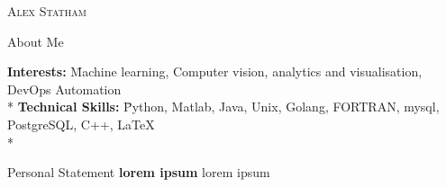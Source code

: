 \documentclass[a4paper]{article}
\newlength{\tabin}
\newlength{\secsep}
\newcommand{\lineunder}{\vspace*{-8pt} \\ \hspace*{-6pt} \hrulefill \\ \vspace*{-15pt}}
\newcommand{\name}[1]{\begin{center}\textsc{\Huge#1}\\\end{center}}
\newcommand{\contact}[1]{\begin{center}\color{contactgray}{\small#1}\end{center}}
\newenvironment{tabbedsection}[1]{
  \begin{list}{}{
      \setlength{\itemsep}{0pt}
      \setlength{\labelsep}{0pt}
      \setlength{\labelwidth}{0pt}
      \setlength{\leftmargin}{\tabin}
      \setlength{\rightmargin}{\tabin}
      \setlength{\listparindent}{0pt}
      \setlength{\parsep}{0pt}
      \setlength{\parskip}{0pt}
      \setlength{\partopsep}{0pt}
      \setlength{\topsep}{#1}
    }
  \item[]
}{\end{list}}
\newenvironment{nospacetabbing}{
    \begin{tabbing}
}{\end{tabbing}\vspace{-1.2em}}
\newenvironment{resume_header}{}{\vspace{0pt}}
\newenvironment{resume_section}[1]{
  \filbreak
  \vspace{2\secsep}
  \textsc{\large#1}
  \lineunder
  \begin{tabbedsection}{\secsep}
}{\end{tabbedsection}}
\begin{document}
\begin{resume_header}
\name{Alex Statham}
\contact{alex.staham1998@gmail.com  $\bullet$ +447490973388 $\bullet$ astatham.com}
\end{resume_header}

\begin{resume_section}{About Me}
  \begin{nospacetabbing}
  \textbf{Interests:}  \= Machine learning, Computer vision, analytics and visualisation, DevOps Automation \\*
  \textbf{Technical Skills:}  \= Python, Matlab, Java, Unix, Golang, FORTRAN, mysql, PostgreSQL, C++,  \LaTeX\\*
  \end{nospacetabbing}
\end{resume_section}

\begin{resume_section}{Personal Statement}
  \textbf{lorem ipsum} lorem ipsum
\end{resume_section}
\end{document}
